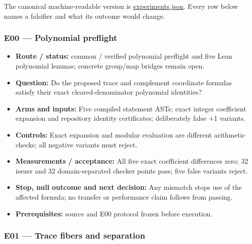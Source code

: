 \documentclass[
  10pt,
]{article}
\providecommand{\tightlist}{%
  \setlength{\itemsep}{0pt}\setlength{\parskip}{0pt}}
\begin{document}
The canonical machine-readable version is \url{experiments.json}. Every
row below names a falsifier and what its outcome would change.

\subsubsection{E00 --- Polynomial
preflight}\label{e00-polynomial-preflight}

\begin{itemize}
\tightlist
\item
  \textbf{Route / status:} common / verified polynomial preflight and
  five Lean polynomial lemmas; concrete group/map bridges remain open.
\item
  \textbf{Question:} Do the proposed trace and complement coordinate
  formulas satisfy their exact cleared-denominator polynomial
  identities?
\item
  \textbf{Arms and inputs:} Five compiled statement ASTs; exact integer
  coefficient expansion and repository identity certificates;
  deliberately false +1 variants.
\item
  \textbf{Controls:} Exact expansion and modular evaluation are
  different arithmetic checks; all negative variants must reject.
\item
  \textbf{Measurements / acceptance:} All five exact coefficient
  differences zero; 32 issuer and 32 domain-separated checker points
  pass; five false variants reject.
\item
  \textbf{Stop, null outcome and next decision:} Any mismatch stops use
  of the affected formula; no transfer or performance claim follows from
  passing.
\item
  \textbf{Prerequisites:} source and E00 protocol frozen before
  execution.
\end{itemize}

\subsubsection{E01 --- Trace fibers and
separation}\label{e01-trace-fibers-and-separation}
\end{document}
